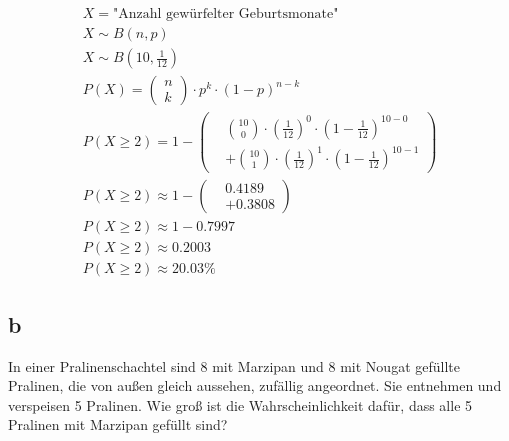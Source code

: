 \begin{align*}
    X = \text{"Anzahl gewürfelter Geburtsmonate"} \\
    X \sim B\left(n, p\right) \\
    X \sim B\left(10, \frac{1}{12}\right) \\
    P(X) = \begin{pmatrix}
        n \\ k
    \end{pmatrix} \cdot p^k \cdot {(1 - p)}^{n - k} \\
    P(X \geq 2) = 1 - \left(
        \begin{aligned}
            & \binom{10}{0} \cdot {\left(\frac{1}{12}\right)}^0 \cdot {\left(1 - \frac{1}{12}\right)}^{10-0} \\
            & + \binom{10}{1} \cdot {\left(\frac{1}{12}\right)}^1 \cdot {\left(1 - \frac{1}{12}\right)}^{10-1}
        \end{aligned}
    \right) \\
    P(X \geq 2) \approx 1 - \left(
        \begin{aligned}
            & 0.4189 \\
            & + 0.3808
        \end{aligned}
    \right) \\
    P(X \geq 2) \approx 1 - 0.7997 \\
    P(X \geq 2) \approx 0.2003 \\
    P(X \geq 2) \approx 20.03\%
\end{align*}

\subsection{b} 

In einer Pralinenschachtel sind 8 mit Marzipan und 8 mit Nougat gefüllte Pralinen, die von außen gleich aussehen, zufällig angeordnet. Sie entnehmen und verspeisen 5 Pralinen. Wie groß ist die Wahrscheinlichkeit dafür, dass alle 5 Pralinen mit Marzipan gefüllt sind?

